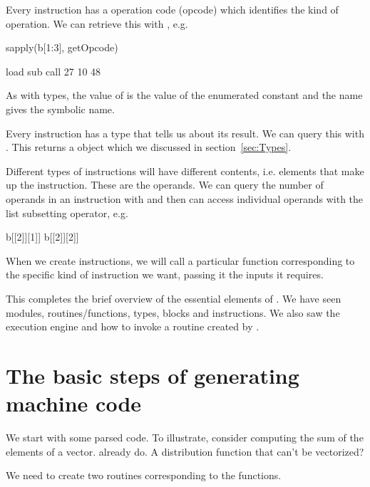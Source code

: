 \documentclass[article]{jss}
\begin{document}
Every instruction has a operation code (opcode) which identifies
the kind of operation. We can retrieve this with ,
e.g.
\begin{RCode}
sapply(b[1:3], getOpcode)
\end{RCode}
\begin{ROutput}
load  sub call 
  27   10   48   
\end{ROutput}
As with types, the value of  is the value of the
\C{} enumerated constant and the name gives the symbolic name.


Every instruction has a type that tells us about its result. 
We can query this with . This returns a
 object which we discussed in section~\ref{sec:Types}.

Different types of instructions will have different contents,
i.e. elements that make up the instruction.
These are the operands.
We can query the number of operands in an instruction with 
and then can access individual operands with the  list subsetting
operator, e.g.
\begin{RCode}
b[[2]][1]]
b[[2]][2]]
\end{RCode}
When we create instructions, we will call a particular
function corresponding to the specific kind of instruction
we want, passing it the inputs it requires.


This completes the brief overview of the essential elements of \llvm.
We have seen modules, routines/functions, types, blocks and
instructions.  We also saw the execution engine and how to 
invoke a routine created by \llvm.


\section{The basic steps of generating machine code}

We start with some parsed code.  To illustrate, consider computing the
sum of the elements of a vector. %
already do. A distribution function that can't be vectorized?%

We need to create two routines corresponding to the \R{} functions.



\end{document}
